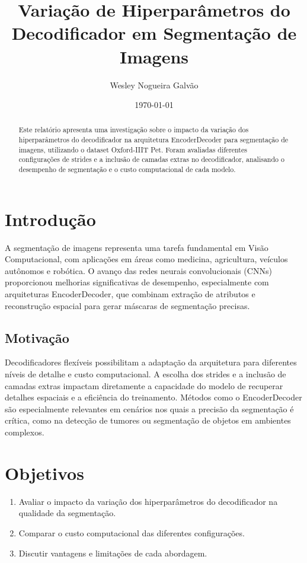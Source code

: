 \documentclass[%
 reprint,
 amsmath,amssymb,
 aps,
]{revtex4-2}
\begin{document}
\title{Variação de Hiperparâmetros do Decodificador em Segmentação de Imagens}

\author{Wesley Nogueira Galvão}

\date{\today}

\begin{abstract}
Este relatório apresenta uma investigação sobre o impacto da variação dos hiperparâmetros do decodificador na arquitetura EncoderDecoder para segmentação de imagens, utilizando o dataset Oxford-IIIT Pet. Foram avaliadas diferentes configurações de strides e a inclusão de camadas extras no decodificador, analisando o desempenho de segmentação e o custo computacional de cada modelo.
\end{abstract}

\maketitle

\section{Introdução}
A segmentação de imagens representa uma tarefa fundamental em Visão Computacional, com aplicações em áreas como medicina, agricultura, veículos autônomos e robótica. O avanço das redes neurais convolucionais (CNNs) proporcionou melhorias significativas de desempenho, especialmente com arquiteturas EncoderDecoder, que combinam extração de atributos e reconstrução espacial para gerar máscaras de segmentação precisas.

\subsection{Motivação}
Decodificadores flexíveis possibilitam a adaptação da arquitetura para diferentes níveis de detalhe e custo computacional. A escolha dos strides e a inclusão de camadas extras impactam diretamente a capacidade do modelo de recuperar detalhes espaciais e a eficiência do treinamento. Métodos como o EncoderDecoder são especialmente relevantes em cenários nos quais a precisão da segmentação é crítica, como na detecção de tumores ou segmentação de objetos em ambientes complexos.

\section{Objetivos}
\begin{enumerate}
    \item Avaliar o impacto da variação dos hiperparâmetros do decodificador na qualidade da segmentação.
    \item Comparar o custo computacional das diferentes configurações.
    \item Discutir vantagens e limitações de cada abordagem.
\end{enumerate}
\end{document}
